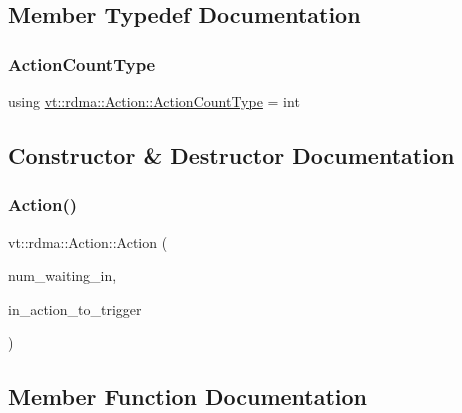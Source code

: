 \subsection{Member Typedef Documentation}
\mbox{\label{structvt_1_1rdma_1_1_action_a7c893809966c9c8c871002d5283728f0}} 
\subsubsection{\texorpdfstring{Action\+Count\+Type}{ActionCountType}}
{\footnotesize\ttfamily using \hyperlink{structvt_1_1rdma_1_1_action_a7c893809966c9c8c871002d5283728f0}{vt\+::rdma\+::\+Action\+::\+Action\+Count\+Type} =  int}



\subsection{Constructor \& Destructor Documentation}
\mbox{\label{structvt_1_1rdma_1_1_action_a06e789113fd8ab00e25e3beb6c36581b}} 
\subsubsection{\texorpdfstring{Action()}{Action()}}
{\footnotesize\ttfamily vt\+::rdma\+::\+Action\+::\+Action (\begin{DoxyParamCaption}\item[{\hyperlink{structvt_1_1rdma_1_1_action_a7c893809966c9c8c871002d5283728f0}{Action\+Count\+Type} const \&}]{num\+\_\+waiting\+\_\+in,  }\item[{\hyperlink{namespacevt_ae0a5a7b18cc99d7b732cb4d44f46b0f3}{Action\+Type}}]{in\+\_\+action\+\_\+to\+\_\+trigger }\end{DoxyParamCaption})\hspace{0.3cm}{\ttfamily [inline]}}



\subsection{Member Function Documentation}
\mbox{\label{structvt_1_1rdma_1_1_action_ab4b3a15189ddb23b25b664ffafd7b2dd}} 
